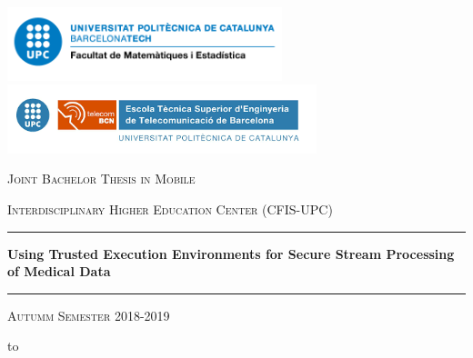\thispagestyle{empty}
\begin{center}

    \includegraphics[width=8cm]{img/logo-fme.png} 
    \hfill
    \includegraphics[width=9cm]{img/logo-upc.png}

    \vspace{0.5cm}

    \Large
    \textsc{Joint Bachelor Thesis in Mobile} 

    \textsc{Interdisciplinary Higher Education Center (CFIS-UPC)}

    \LARGE
    \rule{\textwidth}{0.4pt}
    \textbf{Using Trusted Execution Environments for Secure Stream Processing of Medical Data}
    \rule[0.5cm]{\textwidth}{0.4pt}

    \vspace{-0.2cm}
    \Large
    \textsc{Autumm Semester 2018-2019}
    \vspace{0.7cm}

    \normalsize
    \leavevmode\hbox to 


\end{center}
